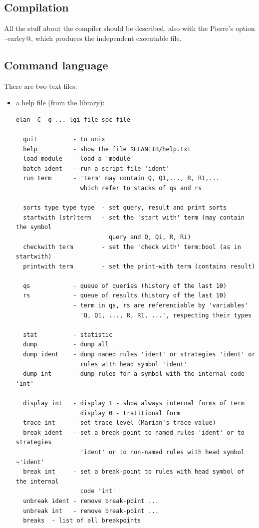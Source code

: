 \documentclass{article}
\begin{document}
\subsection{Compilation}

All the stuff about the compiler should be described, also
with the Pierre's option \verb@--earley@, which produces 
the independent executable file.

\subsection{Command language}

There are two text files:
\begin{itemize}
\item a help file (from the library):
{\scriptsize\begin{verbatim}
elan -C -q ... lgi-file spc-file

  quit          - to unix
  help          - show the file $ELANLIB/help.txt
  load module   - load a 'module' 
  batch ident   - run a script file 'ident'
  run term      - 'term' may contain Q, Q1,..., R, R1,... 
                  which refer to stacks of qs and rs

  sorts type type type  - set query, result and print sorts
  startwith (str)term   - set the 'start with' term (may contain the symbol 
                          query and Q, Qi, R, Ri)
  checkwith term        - set the 'check with' term:bool (as in startwith)
  printwith term        - set the print-with term (contains result)

  qs            - queue of queries (history of the last 10)
  rs            - queue of results (history of the last 10)
                - term in qs, rs are referenciable by 'variables'
                  'Q, Q1, ..., R, R1, ...', respecting their types

  stat          - statistic
  dump          - dump all
  dump ident    - dump named rules 'ident' or strategies 'ident' or
                  rules with head symbol 'ident'
  dump int      - dump rules for a symbol with the internal code 'int'

  display int   - display 1 - show always internal forms of term
                  display 0 - tratitional form 
  trace int     - set trace level (Marian's trace value)
  break ident   - set a break-point to named rules 'ident' or to strategies 
                  'ident' or to non-named rules with head symbol ~'ident'
  break int     - set a break-point to rules with head symbol of the internal
                  code 'int'
  unbreak ident - remove break-point ...
  unbreak int   - remove break-point ...
  breaks  - list of all breakpoints
\end{verbatim}}


\end{itemize}
\end{document}
